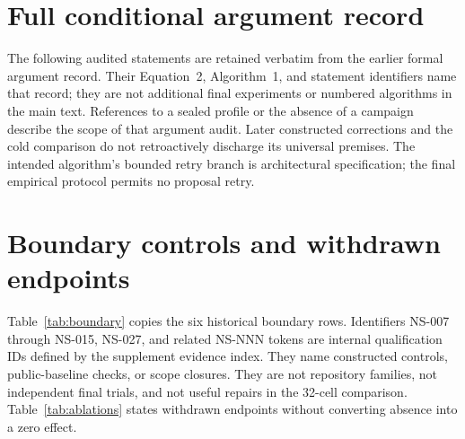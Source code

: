\documentclass{article}
\begin{document}
\clearpage



\clearpage
\appendix
\section{Full conditional argument record}
\label{sec:argument-record}

The following audited statements are retained verbatim from the earlier formal
argument record. Their Equation~2, Algorithm~1, and statement identifiers name
that record; they are not additional final experiments or numbered algorithms
in the main text. References to a sealed profile or the absence of a campaign
describe the scope of that argument audit. Later constructed corrections and
the cold comparison do not retroactively discharge its universal premises.
The intended algorithm's bounded retry branch is architectural specification;
the final empirical protocol permits no proposal retry.



\section{Boundary controls and withdrawn endpoints}
\label{sec:boundary-appendix}

Table~\ref{tab:boundary} copies the six historical boundary rows. Identifiers
NS-007 through NS-015, NS-027, and related NS-NNN tokens are internal
qualification IDs defined by the supplement evidence index. They name
constructed controls, public-baseline checks, or scope closures. They are not
repository families, not independent final trials, and not useful repairs in
the 32-cell comparison. Table~\ref{tab:ablations} states withdrawn endpoints
without converting absence into a zero effect.
\end{document}

